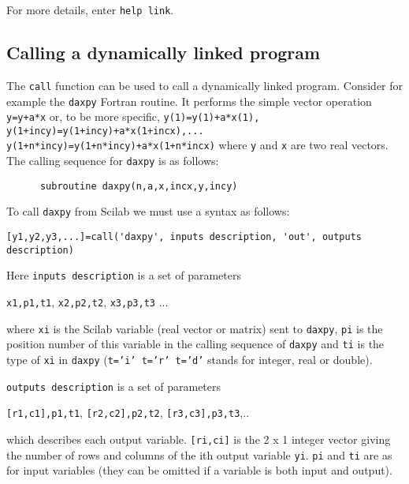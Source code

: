 For more details, enter {\tt help link}.

\subsection{Calling a dynamically linked program}

The {\tt call} function can be used to call a dynamically linked
program. Consider for example the {\tt daxpy} Fortran routine. It performs 
the simple vector operation {\tt y=y+a*x} or, to be more specific,
{\tt y(1)=y(1)+a*x(1), y(1+incy)=y(1+incy)+a*x(1+incx),...
y(1+n*incy)=y(1+n*incy)+a*x(1+n*incx)} 
where {\tt y} and {\tt x} are two real vectors.
The calling sequence for {\tt daxpy} is as follows:
\begin{verbatim}
      subroutine daxpy(n,a,x,incx,y,incy)
\end{verbatim}
To call {\tt daxpy} from Scilab we must use a syntax as follows: 
\begin{verbatim}
[y1,y2,y3,...]=call('daxpy', inputs description, 'out', outputs description)
\end{verbatim}
\noindent
Here {\tt inputs description} is a set of parameters
 
{\tt x1,p1,t1}, {\tt x2,p2,t2}, {\tt x3,p3,t3} ... 

\noindent
where {\tt xi} is the Scilab variable (real vector or matrix) sent to 
{\tt daxpy},
{\tt pi} is the position number of this variable in the calling
sequence of {\tt daxpy} and {\tt ti} is the type of {\tt xi} in {\tt daxpy}
({\tt t='i'  t='r'  t='d'} stands for integer, real or double).

\noindent
{\tt outputs description} is a set of parameters
 
{\tt [r1,c1],p1,t1}, {\tt [r2,c2],p2,t2}, {\tt [r3,c3],p3,t3},..

\noindent
which describes each output variable. {\tt [ri,ci]} is the
2 x 1 integer vector giving the number of rows and columns of the
ith output variable {\tt yi}. {\tt pi} and {\tt ti} are as for
input variables (they can be omitted if a variable is both input and
output). 

